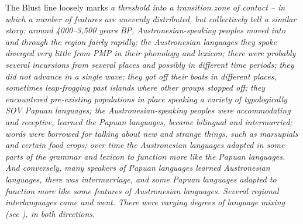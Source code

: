 The Blust line loosely marks \it{a threshold into a transition
zone of contact} -- in which a number of features are unevenly
distributed, but collectively tell a similar story: around 4000--3,500 years
BP, Austronesian-speaking peoples moved into
and through the region fairly rapidly; the Austronesian languages
they spoke diverged very little from PMP in their phonology
and lexicon; there were probably several incursions from several
places and possibly in different time periods; they did not advance
in a single wave; they got off their boats in different places,
sometimes leap-frogging past islands where other groups stopped
off; they encountered pre-existing populations in place speaking
a variety of typologically SOV Papuan languages; the Austronesian-speaking
peoples were accommodating and receptive, learned the Papuan languages,
became bilingual and intermarried; words were borrowed for talking
about new and strange things, such as marsupials
and certain food crops; over time the Austronesian languages
adapted in some parts of the grammar
and lexicon to function more like the Papuan languages.
And conversely, many speakers of Papuan languages learned Austronesian
languages, there was intermarriage, and some Papuan languages adapted to
function more like some features of Austronesian languages.
Several regional interlanguages came and went.
There were varying degrees of language mixing (see \citealp{Ross2017}), in both directions.